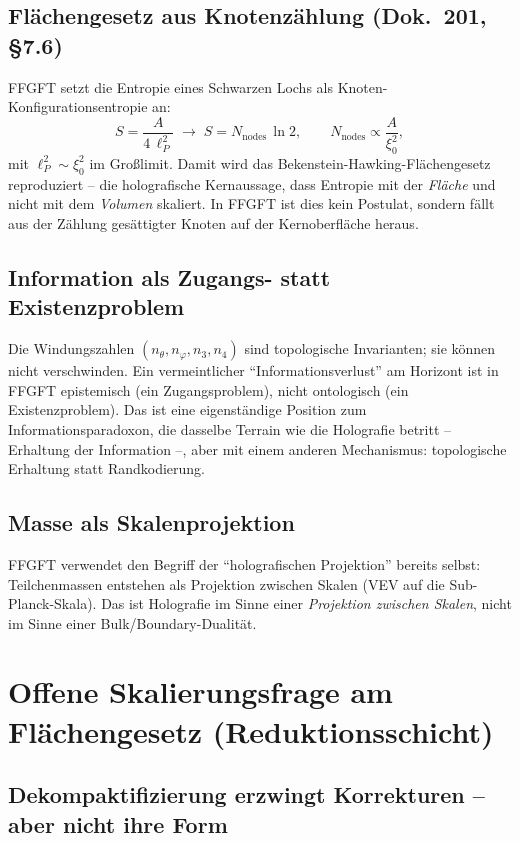\subsection*{Flächengesetz aus Knotenzählung (Dok.~201, §7.6)}

FFGFT setzt die Entropie eines Schwarzen Lochs als
Knoten-Konfigurationsentropie an:
\[
S = \frac{A}{4\,\ell_P^2} \;\longrightarrow\; S = N_{\text{nodes}}\,\ln 2,
\qquad N_{\text{nodes}} \propto \frac{A}{\xi_0^2},
\]
mit $\ell_P^2 \sim \xi_0^2$ im Großlimit. Damit wird das
Bekenstein-Hawking-Flächengesetz reproduziert -- die holografische
Kernaussage, dass Entropie mit der \emph{Fläche} und nicht mit dem
\emph{Volumen} skaliert. In FFGFT ist dies kein Postulat, sondern fällt
aus der Zählung gesättigter Knoten auf der Kernoberfläche heraus.

\subsection*{Information als Zugangs- statt Existenzproblem}

Die Windungszahlen $(n_\theta, n_\varphi, n_3, n_4)$ sind topologische
Invarianten; sie können nicht verschwinden. Ein vermeintlicher
\enquote{Informationsverlust} am Horizont ist in FFGFT epistemisch (ein
Zugangsproblem), nicht ontologisch (ein Existenzproblem). Das ist eine
eigenständige Position zum Informationsparadoxon, die dasselbe Terrain wie
die Holografie betritt -- Erhaltung der Information --, aber mit einem
anderen Mechanismus: topologische Erhaltung statt Randkodierung.

\subsection*{Masse als Skalenprojektion}

FFGFT verwendet den Begriff der \enquote{holografischen Projektion} bereits
selbst: Teilchenmassen entstehen als Projektion zwischen Skalen (VEV auf die
Sub-Planck-Skala). Das ist Holografie im Sinne einer \emph{Projektion
zwischen Skalen}, nicht im Sinne einer Bulk/Boundary-Dualität.

\section{Offene Skalierungsfrage am Flächengesetz (Reduktionsschicht)}
\label{sec:263-offen}

\subsection*{Dekompaktifizierung erzwingt Korrekturen -- aber nicht ihre Form}

